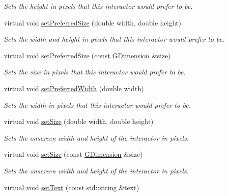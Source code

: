 \begin{DoxyCompactItemize}
\begin{DoxyCompactList}\small\item\em Sets the height in pixels that this interactor would prefer to be. \end{DoxyCompactList}\item 
virtual void \mbox{\hyperlink{classsgl_1_1GInteractor_a042c5ae19430d765ef552371cae3632c}{set\+Preferred\+Size}} (double width, double height)
\begin{DoxyCompactList}\small\item\em Sets the width and height in pixels that this interactor would prefer to be. \end{DoxyCompactList}\item 
virtual void \mbox{\hyperlink{classsgl_1_1GInteractor_aa22d9be4bc0e078bb0ea69b0fc9d7c75}{set\+Preferred\+Size}} (const \mbox{\hyperlink{structsgl_1_1GDimension}{G\+Dimension}} \&size)
\begin{DoxyCompactList}\small\item\em Sets the size in pixels that this interactor would prefer to be. \end{DoxyCompactList}\item 
virtual void \mbox{\hyperlink{classsgl_1_1GInteractor_a3db429ab2fa52efd187eec0ed8cdd9f2}{set\+Preferred\+Width}} (double width)
\begin{DoxyCompactList}\small\item\em Sets the width in pixels that this interactor would prefer to be. \end{DoxyCompactList}\item 
virtual void \mbox{\hyperlink{classsgl_1_1GInteractor_aca25d49481f9bf5fc8f7df4c086c4ce7}{set\+Size}} (double width, double height)
\begin{DoxyCompactList}\small\item\em Sets the onscreen width and height of the interactor in pixels. \end{DoxyCompactList}\item 
virtual void \mbox{\hyperlink{classsgl_1_1GInteractor_ae2b628228f192c2702c4ce941b2af68f}{set\+Size}} (const \mbox{\hyperlink{structsgl_1_1GDimension}{G\+Dimension}} \&size)
\begin{DoxyCompactList}\small\item\em Sets the onscreen width and height of the interactor in pixels. \end{DoxyCompactList}\item 
virtual void \mbox{\hyperlink{classsgl_1_1GTextField_ac1ae51949d41ee9054634be5967d91b8}{set\+Text}} (const std\+::string \&text)

\end{DoxyCompactItemize}
